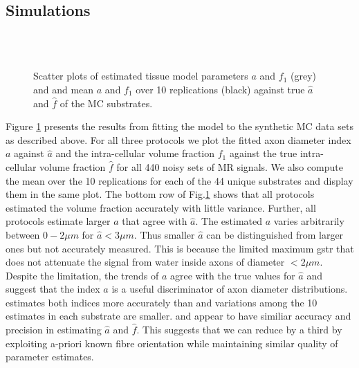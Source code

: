 \subsection*{Simulations}
\begin{figure}
\centering
		\\
		\\
		 
  \caption{Scatter plots of estimated tissue model parameters $a$ and $f_1$ (grey) and and mean $a$ and $f_1$ over 10 replications (black) against true $\hat{a}$ and $\hat{f}$ of the MC substrates.}
  \label{fig:experiment4:mc simulations}
\end{figure}
Figure \ref{fig:experiment4:mc simulations} presents the results from fitting the model to the synthetic MC data sets as described above. For all three protocols we plot the fitted axon diameter index $a$ against $\hat{a}$ and the intra-cellular volume fraction $f_1$ against the true intra-cellular volume fraction $\hat{f}$ for all 440 noisy sets of MR signals. We also compute the mean over the 10 replications for each of the 44 unique substrates and display them in the same plot. The bottom row of Fig.\ref{fig:experiment4:mc simulations} shows that all protocols estimated the volume fraction accurately with little variance. Further, all protocols estimate larger $a$ that agree with $\hat{a}$. The estimated $a$ varies arbitrarily between $0-2\mu m$ for $\hat{a} < 3\mu m$. Thus smaller $\hat{a}$ can be distinguished from larger ones but not accurately measured. This is because the limited maximum {\gls{gstr}} that does not attenuate the signal from water inside axons of diameter $<2\mu m$. Despite the limitation, the trends of $a$ agree with the true
values for $\hat{a}$ and suggest that the index $a$ is a useful discriminator of axon diameter distributions. \SFlong{} estimates both indices more accurately than \OIlong{} and variations among the 10 estimates in each substrate are smaller. \SFshort{} and \OIlong{} appear to have similiar accuracy and precision in estimating $\hat{a}$ and $\hat{f}$. This suggests that we can reduce by a third by exploiting a-priori known fibre orientation while maintaining similar quality of parameter estimates.

